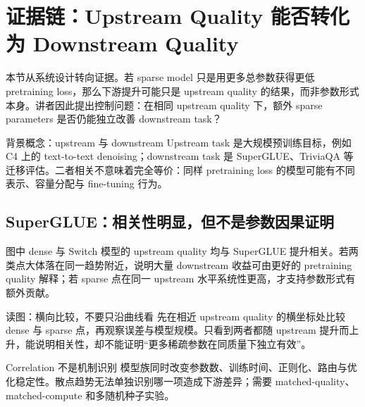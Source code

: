 \section{证据链：Upstream Quality 能否转化为 Downstream Quality}

本节从系统设计转向证据。若 sparse model 只是用更多总参数获得更低 pretraining loss，那么下游提升可能只是 upstream quality 的结果，而非参数形式本身。讲者因此提出控制问题：在相同 upstream quality 下，额外 sparse parameters 是否仍能独立改善 downstream task？


\begin{knowledgebox}{背景概念：upstream 与 downstream}
Upstream task 是大规模预训练目标，例如 C4 上的 text-to-text denoising；downstream task 是 SuperGLUE、TriviaQA 等迁移评估。二者相关不意味着完全等价：同样 pretraining loss 的模型可能有不同表示、容量分配与 fine-tuning 行为。
\end{knowledgebox}

\subsection{SuperGLUE：相关性明显，但不是参数因果证明}

图中 dense 与 Switch 模型的 upstream quality 均与 SuperGLUE 提升相关。若两类点大体落在同一趋势附近，说明大量 downstream 收益可由更好的 pretraining quality 解释；若 sparse 点在同一 upstream 水平系统性更高，才支持参数形式有额外贡献。


\begin{knowledgebox}{读图：横向比较，不要只沿曲线看}
先在相近 upstream quality 的横坐标处比较 dense 与 sparse 点，再观察误差与模型规模。只看到两者都随 upstream 提升而上升，能说明相关性，却不能证明“更多稀疏参数在同质量下独立有效”。
\end{knowledgebox}

\begin{warningbox}{Correlation 不是机制识别}
模型族同时改变参数数、训练时间、正则化、路由与优化稳定性。散点趋势无法单独识别哪一项造成下游差异；需要 matched-quality、matched-compute 和多随机种子实验。
\end{warningbox}


